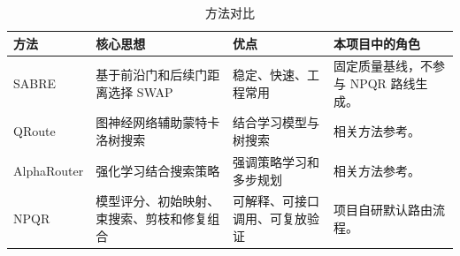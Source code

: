 \begin{table}[H]
  \centering
  \caption{方法对比}
  \label{tab:algorithm-comparison}
  \begin{tabularx}{\linewidth}{lYYY}
    \toprule
    方法 & 核心思想 & 优点 & 本项目中的角色 \\
    \midrule
    SABRE & 基于前沿门和后续门距离选择 SWAP & 稳定、快速、工程常用 & 固定质量基线，不参与 NPQR 路线生成。\\
    QRoute & 图神经网络辅助蒙特卡洛树搜索 & 结合学习模型与树搜索 & 相关方法参考。\\
    AlphaRouter & 强化学习结合搜索策略 & 强调策略学习和多步规划 & 相关方法参考。\\
    NPQR & 模型评分、初始映射、束搜索、剪枝和修复组合 & 可解释、可接口调用、可复放验证 & 项目自研默认路由流程。\\
    \bottomrule
  \end{tabularx}
\end{table}
